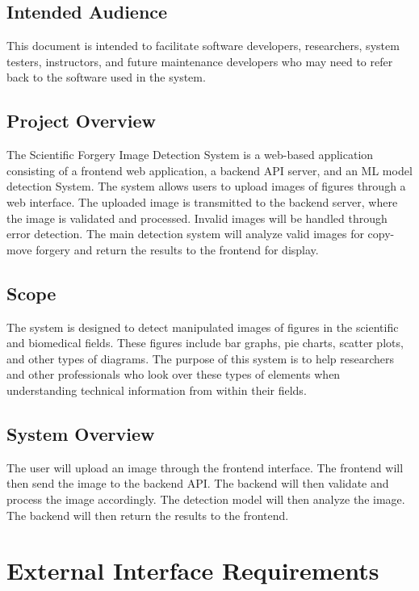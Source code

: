 \documentclass{scrreprt}
\begin{document}
\section{Intended Audience}

This document is intended to facilitate software developers, researchers, system testers, instructors, and future maintenance developers who may need to refer back to the software used in the system.

\section{Project Overview}

The Scientific Forgery Image Detection System is a web-based application consisting of a frontend web application, a backend API server, and an ML model detection System. The system allows users to upload images of figures through a web interface. The uploaded image is transmitted to the backend server, where the image is validated and processed. Invalid images will be handled through error detection. The main detection system will analyze valid images for copy-move forgery and return the results to the frontend for display.

\section{Scope}
The system is designed to detect manipulated images of figures in the scientific and biomedical fields. These figures include bar graphs, pie charts, scatter plots, and other types of diagrams. The purpose of this system is to help researchers and other professionals who look over these types of elements when understanding technical information from within their fields.

\section{System Overview}
The user will upload an image through the frontend interface. The frontend will then send the image to the backend API. The backend will then validate and process the image accordingly. The detection model will then analyze the image. The backend will then return the results to the frontend. 


\chapter{External Interface Requirements}
\end{document}
